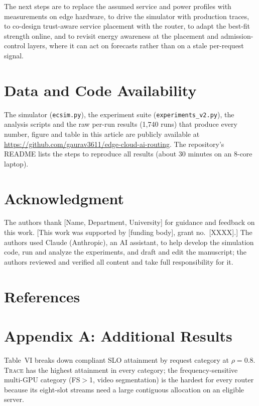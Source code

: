 \documentclass{article}
\newcommand{\sys}{\textsc{Trace}}
\begin{document}
The next steps are to replace the assumed service and power profiles with measurements on edge hardware, to drive the simulator with production traces, to co-design trust-aware service placement with the router, to adapt the best-fit strength online, and to revisit energy awareness at the placement and admission-control layers, where it can act on forecasts rather than on a stale per-request signal.

\section*{Data and Code Availability}
The simulator (\texttt{ecsim.py}), the experiment suite (\texttt{experiments\_v2.py}), the analysis scripts and the raw per-run results (1,740 runs) that produce every number, figure and table in this article are publicly available at \url{https://github.com/gaurav3611/edge-cloud-ai-routing}. The repository's README lists the steps to reproduce all results (about 30 minutes on an 8-core laptop).

\section*{Acknowledgment}
The authors thank [Name, Department, University] for guidance and feedback on this work. [This work was supported by [funding body], grant no.~[XXXX].] The authors used Claude (Anthropic), an AI assistant, to help develop the simulation code, run and analyze the experiments, and draft and edit the manuscript; the authors reviewed and verified all content and take full responsibility for it.

\section*{References}


\section*{Appendix A: Additional Results}

Table~VI breaks down compliant SLO attainment by request category at $\rho=0.8$. \sys{} has the highest attainment in every category; the frequency-sensitive multi-GPU category (FS$>$1, video segmentation) is the hardest for every router because its eight-slot streams need a large contiguous allocation on an eligible server.
\end{document}

